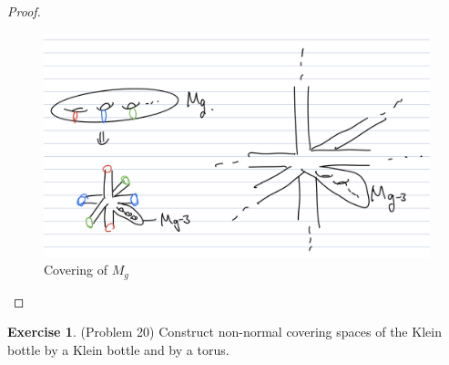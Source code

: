 \documentclass[12pt, psamsfonts]{amsart}
\theoremstyle{definition}
\newtheorem*{exer}{Exercise}
\theoremstyle{remark}
\numberwithin{equation}{section}
\begin{document}
\begin{proof}
  \begin{figure}
    \includegraphics[width=.5\linewidth]{covering_mg.jpeg}
    \caption{Covering of $M_g$}
    \label{fig:covering_mg}
  \end{figure}

\end{proof}

\begin{exer}{(Problem 20)}
  Construct non-normal covering spaces of the Klein bottle by a Klein bottle and by a torus.
\end{exer}
\end{document}
